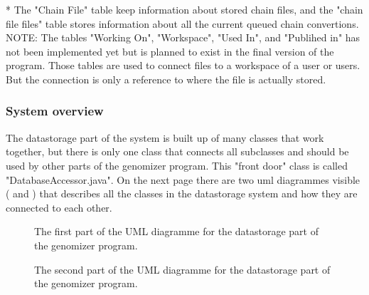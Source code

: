 * The "Chain File" table keep information about stored chain files, and the "chain file files" table stores information about all the current queued chain convertions.\\
NOTE: The tables "Working On", "Workspace", "Used In", and "Publihed in" has not been implemented yet but is planned to exist in the final version of the program. Those tables are used to connect files to a workspace of a user or users. But the connection is only a reference to where the file is actually stored. 

\subsubsection{System overview}
The datastorage part of the system is built up of many classes that work together, but there is only one class that connects all subclasses and should be used by other parts of the genomizer program. This "front door" class is called "DatabaseAccessor.java". On the next page there are two uml diagrammes visible ( and  ) that describes all the classes in the datastorage system and how they are connected to each other.

\FloatBarrier
\newpage
\begin{figure}[H]
\caption{The first part of the UML diagramme for the datastorage part of the genomizer program.}
\label{fig:dat_umlPart1}
\end{figure}

\FloatBarrier

\newpage
\begin{figure}[H]
\caption{The second part of the UML diagramme for the datastorage part of the genomizer program.}
\label{fig:dat_umlPart2}
\end{figure}

\FloatBarrier

\newpage
